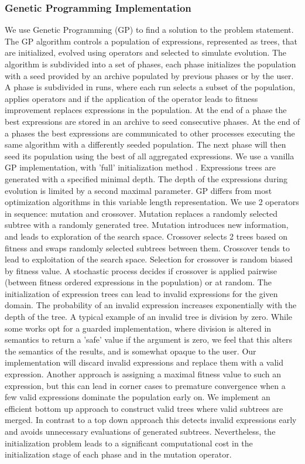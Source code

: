 \subsubsection{Genetic Programming Implementation}
We use Genetic Programming (GP) \cite{GP} to find a solution to the problem statement. The GP algorithm controls a population of expressions, represented as trees, that are initialized, evolved using operators and selected to simulate evolution.
The algorithm is subdivided into a set of phases, each phase initializes the population with a seed provided by an archive populated by previous phases or by the user. A phase is subdivided in runs, where each run selects a subset of the population, applies operators and if the application of the operator leads to fitness improvement replaces expressions in the population. At the end of a phase the best expressions are stored in an archive to seed consecutive phases. At the end of a phases the best expressions are communicated to other processes executing the same algorithm with a differently seeded population. The next phase will then seed its population using the best of all aggregated expressions.
We use a vanilla GP implementation, with 'full' initialization method \cite{GP}. Expressions trees are generated with a specified minimal depth. The depth of the expressions during evolution is limited by a second maximal parameter. GP differs from most optimization algorithms in this variable length representation. 
We use 2 operators in sequence: mutation and crossover. Mutation replaces a randomly selected subtree with a randomly generated tree. Mutation introduces new information, and leads to exploration of the search space. Crossover selects 2 trees based on fitness and swaps randomly selected subtrees between them. Crossover tends to lead to exploitation of the search space. Selection for crossover is random biased by fitness value. A stochastic process decides if crossover is applied pairwise (between fitness ordered expressions in the population) or at random.
The initialization of expression trees can lead to invalid expressions for the given domain. The probability of an invalid expression increases exponentially with the depth of the tree. A typical example of an invalid tree is division by zero. While some works opt for a guarded implementation, where division is altered in semantics to return a 'safe' value if the argument is zero, we feel that this alters the semantics of the results, and is somewhat opaque to the user. Our implementation will discard invalid expressions and replace them with a valid expression. Another approach is assigning a maximal fitness value to such an expression, but this can lead in corner cases to premature convergence when a few valid expressions dominate the population early on. We implement an efficient bottom up approach to construct valid trees where valid subtrees are merged. In contrast to a top down approach this detects invalid expressions early and avoids unnecessary evaluations of generated subtrees. Nevertheless, the initialization problem leads to a significant computational cost in the initialization stage of each phase and in the mutation operator.
